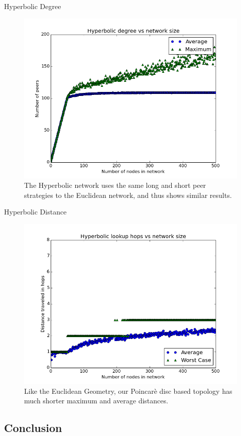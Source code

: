 \documentclass[11pt]{beamer}
\begin{document}
\begin{frame}{Hyperbolic Degree}
	
	\begin{figure}
		\centering
		\includegraphics[width=0.7\linewidth]{figs/HyperbolicDegree}
		\caption[Growth of UrDHT degree in a hyperbolic space]{The Hyperbolic network uses the same long and short peer strategies to the Euclidean network, and thus shows similar results.}
		\label{fig:HyperbolicDegree}
	\end{figure}
\end{frame}
	

\begin{frame}{Hyperbolic Distance}
	\begin{figure}
		\centering
		\includegraphics[width=0.7\linewidth]{figs/HyperbolicDistance}
		\caption[Hops in Hyperbolic UrDHT]{Like the Euclidean Geometry, our Poincar\`{e} disc based topology has much shorter maximum and average distances.
		}
		\label{fig:HyperbolicDistance}
	\end{figure}
\end{frame}
	



\subsection{Conclusion}
\end{document}
